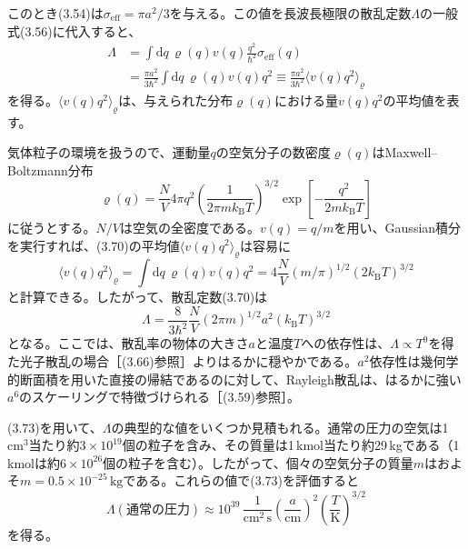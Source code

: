 \hypertarget{srcpage:137}{}\label{srcpage:137}
このとき(3.54)は$\sigma_{\mathrm{eff}}=\pi a^2/3$を与える。この値を長波長極限の散乱定数$\Lambda$の一般式(3.56)に代入すると、
\begin{equation}
\begin{aligned}
\Lambda&=\int\mathrm dq\,\varrho(q)v(q)\frac{q^2}{\hbar^2}\sigma_{\mathrm{eff}}(q)\\
&=\frac{\pi a^2}{3\hbar^2}\int\mathrm dq\,\varrho(q)v(q)q^2
\equiv\frac{\pi a^2}{3\hbar^2}\langle v(q)q^2\rangle_{\varrho}
\end{aligned}\tag{3.70}
\end{equation}
を得る。$\langle v(q)q^2\rangle_{\varrho}$は、与えられた分布$\varrho(q)$における量$v(q)q^2$の平均値を表す。

気体粒子の環境を扱うので、運動量$q$の空気分子の数密度$\varrho(q)$はMaxwell--Boltzmann分布
\begin{equation}
\varrho(q)=\frac NV4\pi q^2\left(\frac{1}{2\pi mk_{\mathrm B}T}\right)^{3/2}\exp\left[-\frac{q^2}{2mk_{\mathrm B}T}\right]
\tag{3.71}
\end{equation}
に従うとする。$N/V$は空気の全密度である。$v(q)=q/m$を用い、Gaussian積分を実行すれば、(3.70)の平均値$\langle v(q)q^2\rangle_{\varrho}$は容易に
\begin{equation}
\langle v(q)q^2\rangle_{\varrho}=\int\mathrm dq\,\varrho(q)v(q)q^2
=4\frac NV(m/\pi)^{1/2}(2k_{\mathrm B}T)^{3/2}
\tag{3.72}
\end{equation}
と計算できる。したがって、散乱定数(3.70)は
\begin{equation}
\Lambda=\frac{8}{3\hbar^2}\frac NV(2\pi m)^{1/2}a^2(k_{\mathrm B}T)^{3/2}
\tag{3.73}
\end{equation}
となる。ここでは、散乱率の物体の大きさ$a$と温度$T$への依存性は、$\Lambda\propto T^9$を得た光子散乱の場合［(3.66)参照］よりはるかに穏やかである。$a^2$依存性は幾何学的断面積を用いた直接の帰結であるのに対して、Rayleigh散乱は、はるかに強い$a^6$のスケーリングで特徴づけられる［(3.59)参照］。

(3.73)を用いて、$\Lambda$の典型的な値をいくつか見積もれる。通常の圧力の空気は1\,cm$^3$当たり約$3\times10^{19}$個の粒子を含み、その質量は1\,kmol当たり約29\,kgである（1\,kmolは約$6\times10^{26}$個の粒子を含む）。したがって、個々の空気分子の質量$m$はおよそ$m=0.5\times10^{-25}\,\mathrm{kg}$である。これらの値で(3.73)を評価すると
\begin{equation}
\Lambda(\text{通常の圧力})\approx10^{39}\,\frac{1}{\mathrm{cm}^2\,\mathrm s}
\left(\frac a{\mathrm{cm}}\right)^2\left(\frac T{\mathrm K}\right)^{3/2}
\tag{3.74}
\end{equation}
を得る。

